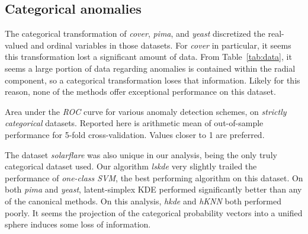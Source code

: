 \subsection{Categorical anomalies}
The categorical transformation of \emph{cover}, \emph{pima}, and \emph{yeast}
    discretized the real-valued and ordinal variables in those datasets.  For 
    \emph{cover} in particular, it seems this transformation lost a significant 
    amount of data.  From Table~\ref{tab:data}, it seems a large portion of 
    data regarding anomalies is contained within the radial component, so a 
    categorical transformation loses that information.  Likely for this reason, 
    none of the methods offer exceptional performance on this dataset.
\begin{table}[ht]
    \centering
    \caption{Area under the \emph{ROC} curve for various anomaly detection 
        schemes, on \emph{strictly categorical} datasets.  Reported here is 
        arithmetic mean of out-of-sample performance for 5-fold cross-validation.  
        Values closer to 1 are preferred.\label{tab:perfcat}}
    \bigskip
    
\end{table}
The dataset \emph{solarflare} was also unique in our analysis, being the only 
    truly categorical dataset used.  Our algorithm \emph{lskde} very slightly 
    trailed the performance of \emph{one-class SVM}, the best performing 
    algorithm on this dataset.  On both \emph{pima} and \emph{yeast}, 
    latent-simplex KDE performed significantly better than any of the canonical 
    methods.  On this analysis, \emph{hkde} and \emph{hKNN} both performed 
    poorly.  It seems the projection of the categorical probability vectors into 
    a unified sphere induces some loss of information.

